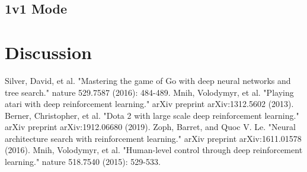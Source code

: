 \documentclass[12pt]{article}
\begin{document}
\subsection{1v1 Mode}



\section{Discussion}




\begin{thebibliography}{99}
	Silver, David, et al. "Mastering the game of Go with deep neural networks and tree search." nature 529.7587 (2016): 484-489.
	Mnih, Volodymyr, et al. "Playing atari with deep reinforcement learning." arXiv preprint arXiv:1312.5602 (2013).
	Berner, Christopher, et al. "Dota 2 with large scale deep reinforcement learning." arXiv preprint arXiv:1912.06680 (2019).
    Zoph, Barret, and Quoc V. Le. "Neural architecture search with reinforcement learning." arXiv preprint arXiv:1611.01578 (2016).
    Mnih, Volodymyr, et al. "Human-level control through deep reinforcement learning." nature 518.7540 (2015): 529-533.
\end{thebibliography}
\end{document}
